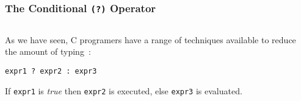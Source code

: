 \begin{frame}[fragile]
\frametitle{The Conditional {\tt (?)} Operator}
\begin{columns}

\begin{column}{0.40\textwidth}
As we have seen, C programers have a range of techniques available to reduce the amount of typing~:
\begin{lstlisting}[style=basicc,numbers=none]
expr1 ? expr2 : expr3
\end{lstlisting}

If {\tt expr1} is {\it true} then {\tt expr2} is executed, else
{\tt expr3} is evaluated.
\end{column}

\begin{column}{0.55\textwidth}

\end{column}

\end{columns}
\end{frame}
